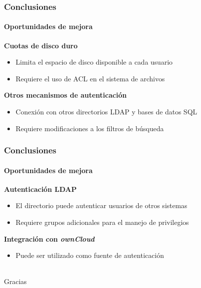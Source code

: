 \documentclass{beamer}
\begin{document}
\begin{frame}
\frametitle{Conclusiones}
\framesubtitle{Oportunidades de mejora}
\justifying

\textbf{Cuotas de disco duro}
\begin{itemize}
 \item Limita el espacio de disco disponible a cada usuario
 \item Requiere el uso de ACL en el sistema de archivos
\end{itemize}

\vspace{2em}

\textbf{Otros mecanismos de autenticaci\'{o}n}
\begin{itemize}
 \item Conexi\'{o}n con otros directorios \textup{LDAP} y bases de datos \textup{SQL}
 \item Requiere modificaciones a los filtros de b\'{u}squeda
\end{itemize}

\end{frame}


\begin{frame}
\frametitle{Conclusiones}
\framesubtitle{Oportunidades de mejora}
\justifying

\textbf{Autenticaci\'{o}n \textup{LDAP}}
\begin{itemize}
 \item El directorio puede autenticar usuarios de otros sistemas
 \item Requiere grupos adicionales para el manejo de privilegios
\end{itemize}

\vspace{2em}

\textbf{Integraci\'{o}n con \textsl{ownCloud}}
\begin{itemize}
 \item Puede ser utilizado como fuente de autenticaci\'{o}n
\\~\\
\end{itemize}

\end{frame}


\begin{frame}
\Huge{\centerline{Gracias}}
\end{frame}

\end{document}
